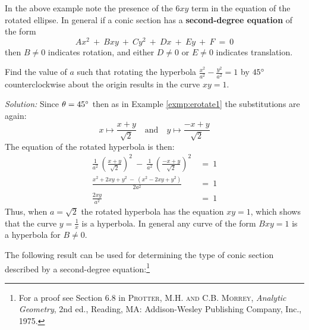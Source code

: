 In the above example note the presence of the $6xy$ term in the equation of the
rotated ellipse. In general if a conic section has a
\textbf{second-degree equation} of the form
\begin{equation}
Ax^2 ~+~ Bxy ~+~ Cy^2 ~+~ Dx ~+~ Ey ~+~ F ~=~ 0\label{eqn:degreetwo}
\end{equation}
then $B \ne 0$ indicates rotation, and either $D \ne 0$ or $E \ne 0$
indicates translation.

\begin{exmp}\label{exmp:hrotate1}
\noindent Find the value of $a$ such that rotating the hyperbola
$\frac{x^2}{a^2} - \frac{y^2}{a^2} = 1$ by $45^\circ$ counterclockwise about
the origin results in the curve $xy=1$.\vspace{1mm}
\par\noindent\emph{Solution:} Since $\theta = 45^\circ$ then as in Example
\ref{exmp:erotate1} the substitutions are again:
\[
x \mapsto \frac{x+y}{\sqrt{2}} \quad\text{and}\quad
y \mapsto \frac{-x+y}{\sqrt{2}}
\]
The equation of the rotated hyperbola is then:
\begin{align*}
\frac{1}{a^2}\,\left(\frac{x+y}{\sqrt{2}}\right)^2 ~-~
\frac{1}{a^2}\,\left(\frac{-x+y}{\sqrt{2}}\right)^2 ~&=~ 1\\[4pt]
\frac{x^2 + 2xy + y^2 ~-~ (x^2 - 2xy + y^2)}{2a^2} ~&=~ 1\\[2pt]
\frac{2xy}{a^2} ~&=~ 1
\end{align*}
Thus, when $a=\sqrt{2}$ the rotated hyperbola has the equation $xy=1$, which
shows that the curve $y=\frac{1}{x}$ is a hyperbola. In general any curve of the
form $Bxy=1$ is a hyperbola for $B \ne 0$.
\end{exmp}\vspace{-2mm}
\divider
\newpage
The following result can be used for determining the type of conic section
described by a second-degree equation:\footnote{For a proof see Section 6.8 in
\textsc{Protter, M.H. and C.B. Morrey}, \emph{Analytic Geometry}, 2nd ed.,
Reading, MA: Addison-Wesley Publishing Company, Inc., 1975.}

